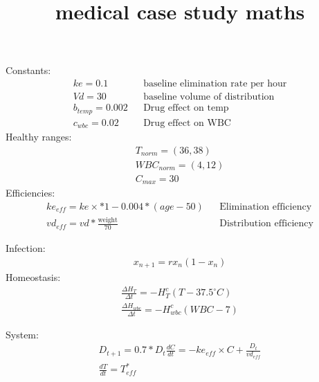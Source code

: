 \documentclass{article}
\title{medical case study maths}
\author{}
\begin{document}
\maketitle

Constants:
\begin{align}
  ke = 0.1 & & \text{baseline elimination rate per hour} \\
  Vd = 30 & & \text{baseline volume of distribution} \\
  b_{temp}=0.002 & & \text{Drug effect on temp}\\
  c_{wbc} = 0.02 & & \text{Drug effect on WBC}
\end{align}
Healthy ranges:
\begin{align}
  T_{norm}=(36,38)\\
  WBC_{norm}=(4,12)\\
  C_{max}=30
\end{align}
Efficiencies:
\begin{align}
  ke_{eff}=ke\times * 1- 0.004 * (age - 50) & & \text{Elimination efficiency}\\
  vd_{eff}=vd * \frac{\text{weight}}{70} & & \text{Distribution efficiency}
\end{align}

Infection:
\begin{align}
  x_{n+1}=rx_n(1-x_n)
\end{align}
Homeostasis:
\begin{align}
  \frac{\Delta H_T}{\Delta t}=-H_T^c\left(T - 37.5^\circ C \right)\\
  \frac{\Delta H_{wbc}}{\Delta t}=-H_{wbc}^c\left(WBC - 7\right)
\end{align}

System:
\begin{align}
  D_{t+1}=0.7*D_t
  \frac{dC}{dt}=-ke_{eff}\times C + \frac{D_t}{vd_{eff}}\\
  \frac{dT}{dt}=T_{eff}^*
\end{align}
\end{document}
